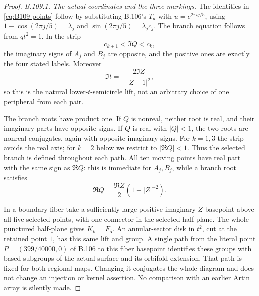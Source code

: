 \begin{proof}
\emph{B.109.1. The actual coordinates and the three markings.}
The identities in \eqref{eq:B109-points} follow by substituting
B.106's $T_u$ with $u=e^{2\pi i j/5}$, using
$1-\cos(2\pi j/5)=\lambda_j$ and
$\sin(2\pi j/5)=\lambda_jc_j$. The branch equation follows from
$qt^2=1$. In the strip
\begin{equation}\label{eq:B109-strip}
 c_{k+1}<\Im Q<c_k,
\end{equation}
the imaginary signs of $A_j$ and $B_j$ are opposite, and the
positive ones are exactly the four stated labels. Moreover
\[
 \Im t=-\frac{2\Im Z}{|Z-1|^2},
\]
so this is the natural lower-$t$-semicircle lift, not an arbitrary
choice of one peripheral from each pair.

The branch roots have product one. If $Q$ is nonreal, neither root
is real, and their imaginary parts have opposite signs. If $Q$ is
real with $|Q|<1$, the two roots are nonreal conjugates, again with
opposite imaginary signs. For $k=1,3$ the strip avoids the real
axis; for $k=2$ below we restrict to $|\Re Q|<1$. Thus the selected
branch is defined throughout each path. All ten moving points have
real part with the same sign as $\Re Q$: this is immediate for
$A_j,B_j$, while a branch root satisfies
\[
 \Re Q=\frac{\Re Z}{2}(1+|Z|^{-2}).
\]

In a boundary fiber take a sufficiently large positive imaginary
$Z$ basepoint above all five selected points, with one connector
in the selected half-plane. The whole punctured half-plane gives
$K_k=F_5$. An annular-sector disk in $t^2$, cut at the retained
point $1$, has this same lift and group. A single path from the
literal point $\bar P=(399/40000,0)$ of B.106 to this fiber
basepoint identifies these groups with based subgroups of the
actual surface and its orbifold extension. That path is fixed for
both regional maps. Changing it conjugates the whole diagram and
does not change an injection or kernel assertion. No comparison
with an earlier Artin array is silently made.


\end{proof}
